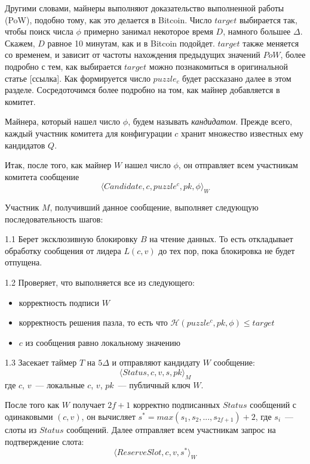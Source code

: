 Другими словами, майнеры выполняют доказательство выполненной работы (PoW), подобно тому, как это делается в Bitcoin.  Число $target$ выбирается так, чтобы поиск числа $\phi$ примерно занимал некоторое время $D$, намного большее $\Delta$. Скажем, $D$ равное 10 минутам, как и в Bitcoin подойдет.  $target$ также меняется со временем, и зависит от частоты нахождения предыдущих значений $PoW$, более подробно с тем, как выбирается $target$ можно познакомиться в оригинальной статье [ссылка].
Как формируется число $puzzle_c$ будет рассказано далее в этом разделе. Сосредоточимся более подробно на том, как майнер добавляется в комитет.

Майнера, который нашел число $\phi$, будем называть \textit{кандидатом}.
Прежде всего, каждый участник комитета для конфигурации $c$ хранит множество известных ему кандидатов $Q$.
\vspace{10pt}

Итак, после того, как майнер $W$ нашел число $\phi$, он отправляет всем участникам комитета сообщение
 \[ \langle Candidate, c, puzzle^c, pk, \phi \rangle_W \]
 
Участник $M$, получивший данное сообщение, выполняет следующую последовательность шагов:

1.1 Берет эксклюзивную блокировку $B$ на чтение данных. То есть откладывает обработку сообщения от лидера $L(c, v)$ до тех пор, пока блокировка не будет отпущена. 

1.2 Проверяет, что выполняется все из следующего:
\begin{itemize}
\item корректность подписи $W$ 
\item корректность решения пазла, то есть что $\mathcal{H}(puzzle^c, pk, \phi) \le target$
\item $c$ из сообщения равно локальному значению
\end{itemize}

1.3 Засекает таймер $T$ на $5\Delta$ и отправляют кандидату $W$ сообщение:
 \[ \langle Status, c, v, s, pk \rangle_M \]
где $c$, $v$~--- локальные  $c$, $v$, $pk$~--- публичный ключ $W$.
\vspace{10pt}

После того как $W$ получает $2f+1$ корректно подписанных $Status$ сообщений с одинаковыми $(c, v)$, он вычисляет $s^{*}=max(s_1, s_2,..., s_{2f+1})+2$, где $s_i$~--- слоты из $Status$ сообщений.
Далее отправляет всем участникам запрос на подтверждение слота:
 \[ \langle ReserveSlot, c, v, s^{*} \rangle_W \]
 
